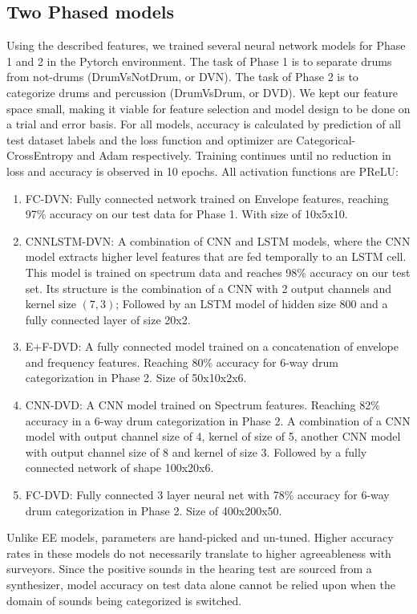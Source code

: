 \documentclass[runningheads,a4paper]{llncs}
\begin{document}
\begin{appendices}
\section{Two Phased models}
Using the described features, we trained several neural network models for Phase 1 and 2 in the Pytorch environment. The task of Phase 1 is to separate drums from not-drums (DrumVsNotDrum, or DVN). The task of Phase 2 is to categorize drums and percussion (DrumVsDrum, or DVD). We kept our feature space small, making it viable for feature selection and model design to be done on a trial and error basis. For all models, accuracy is calculated by prediction of all test dataset labels and the loss function and optimizer are Categorical-CrossEntropy and Adam respectively. Training continues until no reduction in loss and accuracy is observed in 10 epochs.  All activation functions are PReLU:
\begin {enumerate}
\item FC-DVN: Fully connected network trained on Envelope features, reaching 97\% accuracy on our test data for Phase 1. With size of 10x5x10.
\item CNNLSTM-DVN: A combination of CNN and LSTM models, where the CNN model extracts higher level features that are fed temporally to an LSTM cell. This model is trained on spectrum data and reaches 98\% accuracy on our test set. Its structure is the combination of a CNN with 2 output channels and kernel size $(7,3)$; Followed by an LSTM model of hidden size 800 and a fully connected layer of size 20x2.
\item E+F-DVD: A fully connected model trained on a concatenation of envelope and frequency features. Reaching 80\% accuracy for 6-way drum categorization in Phase 2. Size of 50x10x2x6.
\item CNN-DVD: A CNN model trained on Spectrum features. Reaching 82\% accuracy in a 6-way drum categorization in Phase 2. A combination of a CNN model with output channel size of 4, kernel of size of 5, another CNN model with output channel size of 8 and kernel of size 3. Followed by a fully connected network of shape 100x20x6.
\item FC-DVD: Fully connected 3 layer neural net with 78\% accuracy for 6-way drum categorization in Phase 2. Size of 400x200x50.
\end{enumerate}
Unlike EE models, parameters are hand-picked and un-tuned. Higher accuracy rates in these models do not necessarily translate to higher agreeableness with surveyors. Since the positive sounds in the hearing test are sourced from a synthesizer, model accuracy on test data alone cannot be relied upon when the domain of sounds 
being categorized is switched.


\end{appendices}
\end{document}
